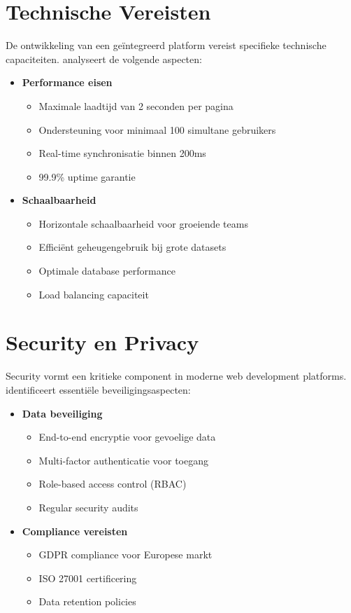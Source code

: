 \section{Technische Vereisten}
\label{sec:technische-vereisten}

De ontwikkeling van een geïntegreerd platform vereist specifieke technische capaciteiten. \textcite{Thompson2024} analyseert de volgende aspecten:

\begin{itemize}
    \item \textbf{Performance eisen}
    \begin{itemize}
        \item Maximale laadtijd van 2 seconden per pagina
        \item Ondersteuning voor minimaal 100 simultane gebruikers
        \item Real-time synchronisatie binnen 200ms
        \item 99.9\% uptime garantie
    \end{itemize}
    
    \item \textbf{Schaalbaarheid}
    \begin{itemize}
        \item Horizontale schaalbaarheid voor groeiende teams
        \item Efficiënt geheugengebruik bij grote datasets
        \item Optimale database performance
        \item Load balancing capaciteit
    \end{itemize}
\end{itemize}

\section{Security en Privacy}
\label{sec:security}

Security vormt een kritieke component in moderne web development platforms. \textcite{Kumar2023} identificeert essentiële beveiligingsaspecten:

\begin{itemize}
    \item \textbf{Data beveiliging}
    \begin{itemize}
        \item End-to-end encryptie voor gevoelige data
        \item Multi-factor authenticatie voor toegang
        \item Role-based access control (RBAC)
        \item Regular security audits
    \end{itemize}
    
    \item \textbf{Compliance vereisten}
    \begin{itemize}
        \item GDPR compliance voor Europese markt
        \item ISO 27001 certificering
        \item Data retention policies
    \end{itemize}
\end{itemize}

